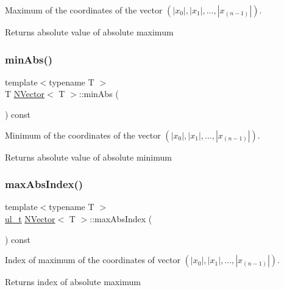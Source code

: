 Maximum of the coordinates of the vector $ (|x_0|, |x_1|, ..., |x_{(n-1)}|) $. 

\begin{DoxyReturn}{Returns}
absolute value of absolute maximum 
\end{DoxyReturn}
\mbox{\label{class_n_vector_a857878b360cede51eb87924cd46d5a54}} 
\subsubsection{\texorpdfstring{minAbs()}{minAbs()}}
{\footnotesize\ttfamily template$<$typename T $>$ \\
T \mbox{\hyperlink{class_n_vector}{N\+Vector}}$<$ T $>$\+::min\+Abs (\begin{DoxyParamCaption}{ }\end{DoxyParamCaption}) const}



Minimum of the coordinates of the vector $ (|x_0|, |x_1|, ..., |x_{(n-1)}|) $. 

\begin{DoxyReturn}{Returns}
absolute value of absolute minimum 
\end{DoxyReturn}
\mbox{\label{class_n_vector_ac7d7d39b68956da9018684a3706a70c2}} 
\subsubsection{\texorpdfstring{maxAbsIndex()}{maxAbsIndex()}}
{\footnotesize\ttfamily template$<$typename T $>$ \\
\mbox{\hyperlink{group___n_algebra_ga1b140a2034db3f5dfe18a987745df43a}{ul\+\_\+t}} \mbox{\hyperlink{class_n_vector}{N\+Vector}}$<$ T $>$\+::max\+Abs\+Index (\begin{DoxyParamCaption}{ }\end{DoxyParamCaption}) const}



Index of maximum of the coordinates of vector $ (|x_0|, |x_1|, ..., |x_{(n-1)}|) $. 

\begin{DoxyReturn}{Returns}
index of absolute maximum 
\end{DoxyReturn}
\mbox{\label{class_n_vector_a8b9147431ee1f9c5a25c6e0b2f793c40}} 
